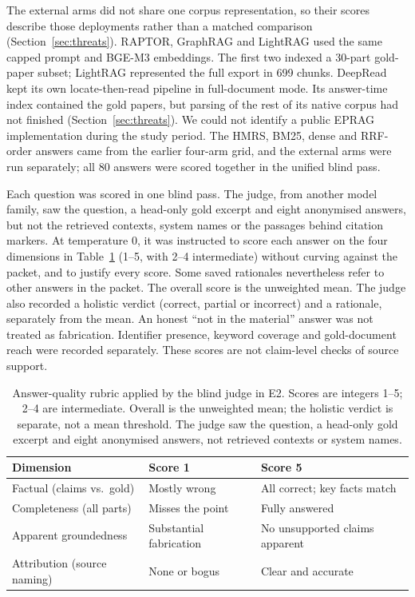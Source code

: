 The external arms did not share one corpus representation, so their scores
describe those deployments rather than a matched comparison
(Section~\ref{sec:threats}). RAPTOR, GraphRAG and LightRAG used the same
capped prompt and BGE-M3 embeddings. The first two indexed a 30-part gold-paper subset; LightRAG
represented the full export in 699 chunks. DeepRead kept its own
locate-then-read pipeline in full-document mode. Its answer-time index
contained the gold papers, but parsing of the rest of its native corpus had
not finished (Section~\ref{sec:threats}). We could not identify a public
EPRAG implementation during the study period. The HMRS, BM25, dense and
RRF-order answers came from the earlier four-arm grid, and the external arms
were run separately; all 80 answers were scored together in the unified
blind pass.

Each question was scored in one blind pass. The judge, from another model
family, saw the question, a head-only gold excerpt and eight anonymised
answers, but not the retrieved contexts, system names or the passages behind
citation markers. At temperature 0, it was instructed to score each answer
on the four dimensions in Table~\ref{tab:rubric} (1--5, with 2--4
intermediate) without curving against the packet, and to justify every
score. Some saved rationales nevertheless refer to other answers in the
packet. The overall score is the unweighted mean. The judge also recorded a
holistic verdict (correct, partial or incorrect) and a rationale, separately
from the mean. An honest ``not in the material'' answer was not treated as
fabrication. Identifier presence, keyword coverage and gold-document reach
were recorded separately. These scores are not claim-level checks of source
support.

\begin{table}[!t]
\centering
\scriptsize
\setlength{\tabcolsep}{2.5pt}
\renewcommand{\arraystretch}{1.03}
\caption{Answer-quality rubric applied by the blind judge in E2. Scores are
integers 1--5; 2--4 are intermediate. Overall is the unweighted mean; the
holistic verdict is separate, not a mean threshold. The judge saw the
question, a head-only gold excerpt and eight anonymised answers, not
retrieved contexts or system names.}
\label{tab:rubric}
\begin{tabular}{@{}>{\raggedright\arraybackslash}p{}>{\raggedright\arraybackslash}p{}>{\raggedright\arraybackslash}p{}@{}}
\toprule
Dimension & Score 1 & Score 5\\
\midrule
Factual (claims vs.\ gold) & Mostly wrong & All correct; key facts match\\
Completeness (all parts) & Misses the point & Fully answered\\
Apparent groundedness & Substantial fabrication & No unsupported claims apparent\\
Attribution (source naming) & None or bogus & Clear and accurate\\
\bottomrule
\end{tabular}
\end{table}

